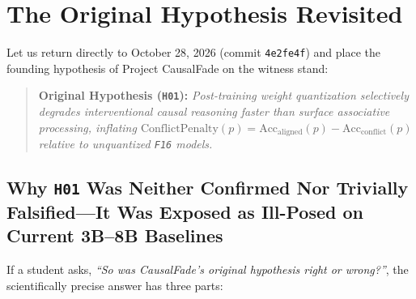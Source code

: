 \chapter{The Original Hypothesis Revisited}\label{ch:revisited}

Let us return directly to October 28, 2026 (commit \texttt{4e2fe4f}) and place the founding hypothesis of Project CausalFade on the witness stand:

\begin{quote}
\textbf{Original Hypothesis (\texttt{H01}):} \emph{Post-training weight quantization selectively degrades interventional causal reasoning faster than surface associative processing, inflating $\mathrm{ConflictPenalty}(p) = \mathrm{Acc}_{\mathrm{aligned}}(p) - \mathrm{Acc}_{\mathrm{conflict}}(p)$ relative to unquantized \texttt{F16} models.}
\end{quote}

\section{Why \texttt{H01} Was Neither Confirmed Nor Trivially Falsified---It Was Exposed as Ill-Posed on Current 3B--8B Baselines}

If a student asks, \emph{``So was CausalFade's original hypothesis right or wrong?''}, the scientifically precise answer has three parts:

